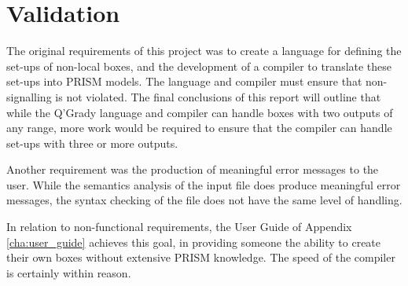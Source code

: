 \documentclass[report.tex]{subfiles}
\begin{document}
\section{Validation} %
\label{sec:validation}
The original requirements of this project was to create a language for defining
the set-ups of non-local boxes, and the development of a compiler to translate
these set-ups into PRISM models. The language and compiler must ensure that
non-signalling is not violated. The final conclusions of this report will
outline that while the Q'Grady language and compiler can handle boxes with two
outputs of any range, more work would be required to ensure that the compiler
can handle set-ups with three or more outputs.

Another requirement was the production of meaningful error messages to the user.
While the semantics analysis of the input file does produce meaningful error
messages, the syntax checking of the file does not have the same level of
handling.

In relation to non-functional requirements, the User Guide of Appendix
\ref{cha:user_guide} achieves this goal, in providing someone the ability to
create their own boxes without extensive PRISM knowledge. The speed of the
compiler is certainly within reason.
\newpage
\end{document}

